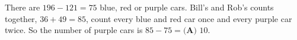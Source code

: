 There are $196-121=75$ blue, red or purple cars. Bill's and Rob's counts together, $36+49=85$, count every blue and red car once and every purple car twice. So the number of purple cars is $85-75=\boxed{\textbf{(A) }10}$.
